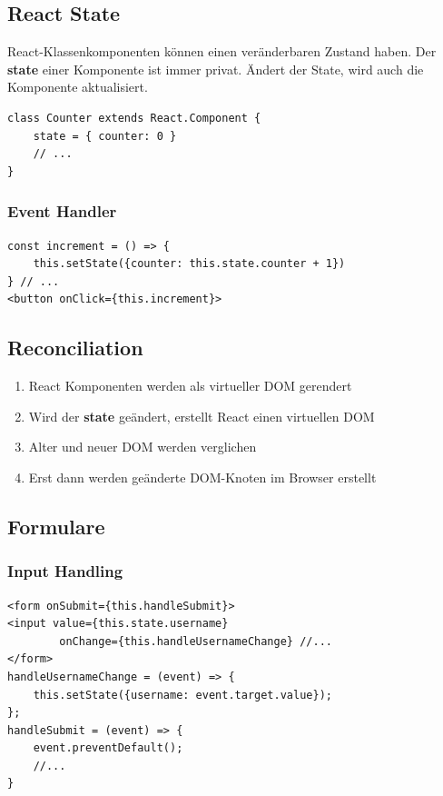 \subsection{React State}
React-Klassenkomponenten können einen veränderbaren Zustand haben.
Der \textbf{state} einer Komponente ist immer privat.
Ändert der State, wird auch die Komponente aktualisiert.
\begin{lstlisting}
class Counter extends React.Component {
    state = { counter: 0 }
    // ...
}
\end{lstlisting}

\subsubsection{Event Handler}
\begin{lstlisting}
const increment = () => {
    this.setState({counter: this.state.counter + 1})
} // ...
<button onClick={this.increment}>
\end{lstlisting}

\subsection{Reconciliation}
\begin{enumerate}
    \item React Komponenten werden als virtueller DOM gerendert
    \item Wird der \textbf{state} geändert, erstellt React einen virtuellen DOM
    \item Alter und neuer DOM werden verglichen
    \item Erst dann werden geänderte DOM-Knoten im Browser erstellt
\end{enumerate}

\subsection{Formulare}
\subsubsection{Input Handling}
\begin{lstlisting}
<form onSubmit={this.handleSubmit}>
<input value={this.state.username}
        onChange={this.handleUsernameChange} //...
</form>
handleUsernameChange = (event) => {
    this.setState({username: event.target.value});
};
handleSubmit = (event) => {
    event.preventDefault();
    //...
}
\end{lstlisting}

